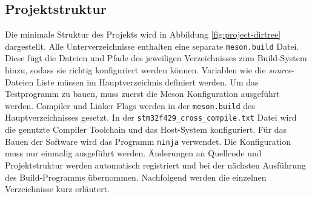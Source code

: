\subsection{Projektstruktur}

Die minimale Struktur des Projekts wird in Abbildung \ref{fig:project-dirtree}
dargestellt.
\newline
Alle Unterverzeichnisse enthalten eine separate \texttt{meson.build} Datei.
Diese fügt die Dateien und Pfade des jeweiligen Verzeichnisses zum Build-System
hinzu, sodass sie richtig konfiguriert werden können.
Variablen wie die \textit{source}-Dateien Liste müssen im Hauptverzeichnis
definiert werden.
Um das Testprogramm zu bauen, muss zuerst die Meson Konfiguration ausgeführt
werden.
Compiler und Linker Flags werden in der \texttt{meson.build} des
Hauptverzeichnisses gesetzt.
In der \texttt{stm32f429\_cross\_compile.txt} Datei wird die genutzte Compiler
Toolchain und das Host-System konfiguriert.
Für das Bauen der Software wird das Programm \texttt{ninja} verwendet.
Die Konfiguration muss nur einmalig ausgeführt werden.
Änderungen an Quellcode und Projektstruktur werden automatisch registriert und
bei der nächsten Ausführung des Build-Programms übernommen.
\newline
Nachfolgend werden die einzelnen Verzeichnisse kurz erläutert.
